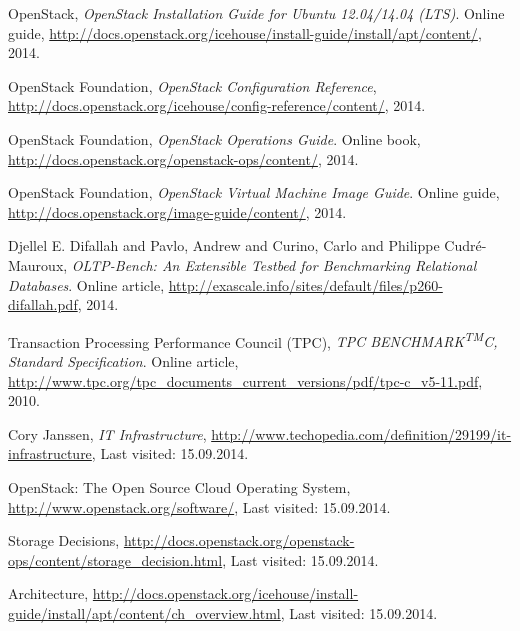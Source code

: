 \begin{thebibliography}{9}

	OpenStack, \emph{OpenStack Installation Guide for Ubuntu 12.04/14.04 (LTS)}. 
	Online guide, 
	\url{http://docs.openstack.org/icehouse/install-guide/install/apt/content/}, 
	2014.

	OpenStack Foundation, \emph{OpenStack Configuration Reference}, 
	\url{http://docs.openstack.org/icehouse/config-reference/content/}, 
	2014.

	OpenStack Foundation, \emph{OpenStack Operations Guide}. 
	Online book,
	\url{http://docs.openstack.org/openstack-ops/content/}, 
	2014.

	OpenStack Foundation, \emph{OpenStack Virtual Machine Image Guide}. 
	Online guide,
	\url{http://docs.openstack.org/image-guide/content/}, 
	2014.

  Djellel E. Difallah and Pavlo, Andrew and Curino, Carlo and Philippe Cudr{\'e}-Mauroux,
  \emph{OLTP-Bench: An Extensible Testbed for Benchmarking Relational Databases}.
  Online article, \url{http://exascale.info/sites/default/files/p260-difallah.pdf}, 
  2014.

  Transaction Processing Performance Council (TPC),
  \emph{TPC BENCHMARK\textsuperscript{TM}C, Standard Specification}.
  Online article, \url{http://www.tpc.org/tpc_documents_current_versions/pdf/tpc-c_v5-11.pdf}, 
  2010.


	Cory Janssen,
	\emph{IT Infrastructure}, 
	\url{http://www.techopedia.com/definition/29199/it-infrastructure}, 
	Last visited: 15.09.2014.

	OpenStack: The Open Source Cloud Operating System, 
	\url{http://www.openstack.org/software/}, 
	Last visited: 15.09.2014.

	Storage Decisions, 
	\url{http://docs.openstack.org/openstack-ops/content/storage_decision.html}, 
	Last visited: 15.09.2014.



	Architecture, 
	\url{http://docs.openstack.org/icehouse/install-guide/install/apt/content/ch_overview.html}, 
	Last visited: 15.09.2014.


\end{thebibliography}